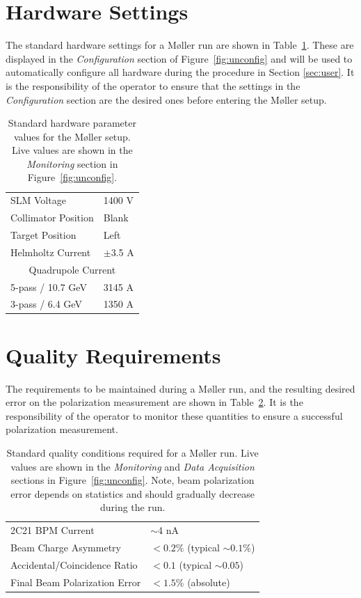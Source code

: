 \documentclass[amsmath,amssymb,notitlepage,12pt]{revtex4}
\begin{document}
\newpage

\section{Hardware Settings}
The standard hardware settings for a M{\o}ller run are shown in Table~\ref{tab:pars}.  These are displayed in the {\em Configuration} section of Figure~\ref{fig:unconfig} and will be used to automatically configure all hardware during the procedure in Section \ref{sec:user}.  It is the responsibility of the operator to ensure that the settings in the {\em Configuration} section are the desired ones before entering the M{\o}ller setup.
\begin{table}[htbp]\centering
    \begin{tabular}{ll}\toprule[1.5pt]
        SLM Voltage & 1400 V \\
        Collimator Position & Blank \\
        Target Position & Left \\
        Helmholtz Current & $\pm$3.5 A \\
        \cmidrule[0.5pt]{1-2}
        \multicolumn{2}{c}{Quadrupole Current} \\
        5-pass / 10.7 GeV & 3145 A\\
        3-pass / 6.4 GeV & 1350 A\\
        \bottomrule[1.5pt]
    \end{tabular}
    \caption{Standard hardware parameter values for the M{\o}ller setup.  Live values are shown in the {\em Monitoring} section in Figure~\ref{fig:unconfig}.\label{tab:pars}}
\end{table}

\section{Quality Requirements}\label{sec:quality}
The requirements to be maintained during a M{\o}ller run, and the resulting desired error on the polarization measurement are shown in Table~\ref{tab:reqs}.  It is the responsibility of the operator to monitor these quantities to ensure a successful polarization measurement.
\begin{table}[htbp]\centering
    \begin{tabular}{ll}\toprule[1.5pt]
        2C21 BPM Current & $\sim$4 nA\\
        Beam Charge Asymmetry & $<0.2\%$ (typical $\sim 0.1\%$)\\
        Accidental/Coincidence Ratio & $<0.1$ (typical $\sim 0.05$)\\
        Final Beam Polarization Error & $<1.5\%$ (absolute)\\
        \bottomrule[1.5pt]
    \end{tabular}
    \caption{Standard quality conditions required for a M{\o}ller run.  Live values are shown in the {\em Monitoring} and {\em Data Acquisition} sections in Figure~\ref{fig:unconfig}.  Note, beam polarization error depends on statistics and should gradually decrease during the run.\label{tab:reqs}}
\end{table}
\end{document}
